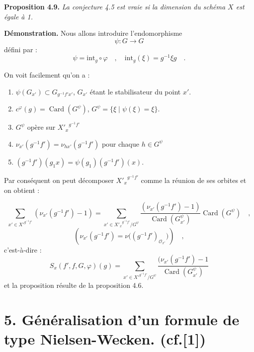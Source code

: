 \medskip
\noindent
\textbf{Proposition 4.9.} \emph{La conjecture 4.5 est vraie si la dimension du schéma $X$ est égale à 1.}

\medskip

\noindent
\textbf{Démonstration.} Nous allons introduire l'endomorphisme
\[
\psi : G \longrightarrow G
\]
défini par :
\[
\psi = \mathrm{int}_g \circ \varphi \quad , \quad \mathrm{int}_g(\xi) = g^{-1}\xi g \quad .
\]

On voit facilement qu'on a :
\begin{enumerate}
\item[i)] $\psi(G_{x'}) \subset G_{g^{-1}f'x'}$, $G_{x'}$ étant le stabilisateur du point $x'$.
\item[ii)] $c^\varphi(g) = \operatorname{Card}(G^\psi)$, $G^\psi = \{ \xi \mid \psi(\xi) = \xi \}$.
\item[iii)] $G^\psi$ opère sur ${X'_x}^{g^{-1}f'}$
\item[i$\nu$)] $\nu_{x'}(g^{-1}f') = \nu_{hx'}(g^{-1}f')$ pour chaque $h \in G^\psi$
\item[$\nu$)] $(g^{-1}f')(g_1x) = \psi(g_1)(g^{-1}f')(x)$.
\end{enumerate}

Par conséquent on peut décomposer ${X'_x}^{g^{-1}f'}$ comme la réunion de ses orbites et on obtient :

\begin{equation}\tag{4.9.1}
\sum_{x' \in {X'}^{g^{-1}f'}} (\nu_{x'}(g^{-1}f') - 1) = \sum_{x' \in {X'_x}^{g^{-1}f'}/G^\psi} \frac{(\nu_{x'}(g^{-1}f') - 1)}{\operatorname{Card}(G^\psi_{x'})} \operatorname{Card}(G^\psi) \quad ,
\end{equation}
\[
(\nu_{x'}(g^{-1}f')=\nu\bigl((g^{-1}f')_{\mathcal{O}_{x'}}\bigr)) \quad ,
\]
c'est-à-dire :
\begin{equation}\tag{4.9.2}
S_x(f',f,G,\varphi)(g)=\sum_{x' \in {X'}^{g^{-1}f'}/G^\psi}
\frac{(\nu_{x'}(g^{-1}f')-1}{\operatorname{Card}(G^\psi_{x'})}
\end{equation}
et la proposition résulte de la proposition 4.6.


\section*{5. Généralisation d'un formule de type Nielsen-Wecken. {\normalfont (cf.[1])}}


